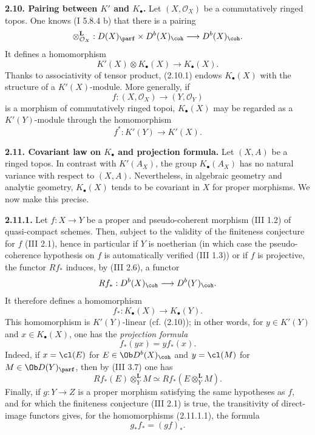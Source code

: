\textbf{2.10. Pairing between \(K'\) and \(K_{\bullet}\).} Let \((X,\mathcal O_X)\) be a commutatively ringed topos. One knows (I 5.8.4 b) that there is a pairing
\[
 \otimes_{\mathcal O_X}^{\mathbf L}:D(X)_{\parf}\times D^b(X)_{\coh}
 \longrightarrow D^b(X)_{\coh}.
\]
It defines a homomorphism
\begin{equation}\tag{2.10.1}
 K'(X)\otimes K_{\bullet}(X)\longrightarrow K_{\bullet}(X).
\end{equation}
Thanks to associativity of tensor product, (2.10.1) endows \(K_{\bullet}(X)\) with the structure of a \(K'(X)\)-module. More generally, if
\[
 f:(X,\mathcal O_X)\longrightarrow (Y,\mathcal O_Y)
\]
is a morphism of commutatively ringed topoi, \(K_{\bullet}(X)\) may be regarded as a \(K'(Y)\)-module through the homomorphism
\[
 f^*:K'(Y)\longrightarrow K'(X).
\]

\textbf{2.11. Covariant law on \(K_{\bullet}\) and projection formula.} Let \((X,A)\) be a ringed topos. In contrast with \(K'(A_X)\), the group \(K_{\bullet}(A_X)\) has no natural variance with respect to \((X,A)\). Nevertheless, in algebraic geometry and analytic geometry, \(K_{\bullet}(X)\) tends to be covariant in \(X\) for proper morphisms. We now make this precise.

\textbf{2.11.1.} Let \(f:X\to Y\) be a proper and pseudo-coherent morphism (III 1.2) of quasi-compact schemes. Then, subject to the validity of the finiteness conjecture for \(f\) (III 2.1), hence in particular if \(Y\) is noetherian (in which case the pseudo-coherence hypothesis on \(f\) is automatically verified (III 1.3)) or if \(f\) is projective, the functor \(Rf_*\) induces, by (III 2.6), a functor
\[
 Rf_*:D^b(X)_{\coh}\longrightarrow D^b(Y)_{\coh}.
\]
It therefore defines a homomorphism
\begin{equation}\tag{2.11.1.1}
 f_*:K_{\bullet}(X)\longrightarrow K_{\bullet}(Y).
\end{equation}
This homomorphism is \(K'(Y)\)-linear (cf. (2.10)); in other words, for \(y\in K'(Y)\) and \(x\in K_{\bullet}(X)\), one has the \emph{projection formula}
\begin{equation}\tag{2.11.1.2}
 f_*(yx)=y f_*(x).
\end{equation}
Indeed, if \(x=\cl(E)\) for \(E\in\Ob D^b(X)_{\coh}\) and \(y=\cl(M)\) for \(M\in\Ob D(Y)_{\parf}\), then by (III 3.7) one has
\[
 Rf_*(E)\otimes_Y^{\mathbf L}M\simeq
 Rf_*(E\otimes_Y^{\mathbf L}M).
\]
Finally, if \(g:Y\to Z\) is a proper morphism satisfying the same hypotheses as \(f\), and for which the finiteness conjecture (III 2.1) is true, the transitivity of direct-image functors gives, for the homomorphisms (2.11.1.1), the formula
\begin{equation}\tag{2.11.1.3}
 g_*f_*=(gf)_*.
\end{equation}

